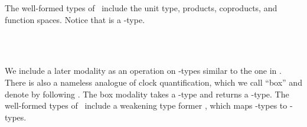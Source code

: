 The well-formed types of \GTT\ include the unit type,
products, coproducts, and function spaces. Notice that  is a
-type.
\begin{AgdaAlign}
\begin{code}%
\>[0][@{}l@{\AgdaIndent{1}}]%
\>[2]\AgdaSpace{}%
\AgdaSpace{}%
\AgdaSymbol{:}\AgdaSpace{}%
\AgdaSpace{}%
\AgdaSpace{}%
\AgdaSpace{}%
\<%
\\
\>[2][@{}l@{\AgdaIndent{0}}]%
\>[4]\AgdaSpace{}%
\AgdaSymbol{:}\AgdaSpace{}%
\AgdaSpace{}%
\<%
\\
%
\>[4]\AgdaSpace{}%
\AgdaSpace{}%
\AgdaSpace{}%
\AgdaSymbol{:}\AgdaSpace{}%
\AgdaSpace{}%
\AgdaSymbol{\{}\AgdaSymbol{\}}\AgdaSpace{}%
\AgdaSpace{}%
\AgdaSpace{}%
\AgdaSpace{}%
\AgdaSpace{}%
\AgdaSpace{}%
\AgdaSpace{}%
\AgdaSpace{}%
\AgdaSpace{}%
\<%
\end{code}

We include a later modality  as an operation on -types similar to the one in \AM.
There is also a nameless analogue of clock quantification, which we call ``box'' and denote by 
following \cite{CloustonBGB15}. The box modality takes a
-type and returns a -type. The well-formed types of \GTT\
include a weakening type former , which maps -types to
\IC{κ}-types.
\begin{code}%
%
\>[4]\AgdaSpace{}%
\AgdaSymbol{:}\AgdaSpace{}%
\AgdaSpace{}%
\AgdaSpace{}%
\AgdaSpace{}%
\AgdaSpace{}%
\<%
\\
%
\>[4]\AgdaSpace{}%
\AgdaSymbol{:}\AgdaSpace{}%
\AgdaSpace{}%
\AgdaSpace{}%
\AgdaSpace{}%
\AgdaSpace{}%
\<%
\\
%
\>[4]\AgdaSpace{}%
\AgdaSymbol{:}\AgdaSpace{}%
\AgdaSpace{}%
\AgdaSpace{}%
\AgdaSpace{}%
\AgdaSpace{}%
\<%
\end{code}


\end{AgdaAlign}
